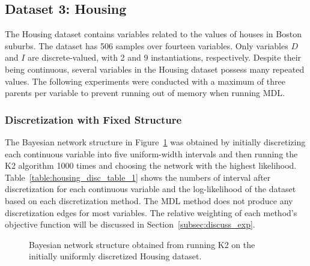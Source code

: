 \documentclass[twoside,11pt]{article}
\begin{document}
\subsection{Dataset 3: Housing}
\label{subsec:housing}

The Housing dataset contains variables related to the values of houses in Boston suburbs.
The dataset has \num{506} samples over fourteen variables.
Only variables $D$ and $I$ are discrete-valued, with \num{2} and \num{9} instantiations, respectively.
Despite their being continuous, several variables in the Housing dataset possess many repeated values.
The following experiments were conducted with a maximum of three parents per variable to prevent running out of memory when running MDL.

\subsubsection{Discretization with Fixed Structure}
\label{subsubsec:housing_exp1}

The Bayesian network structure in Figure~\ref{fig:housing_graph_1} was obtained by initially discretizing each continuous variable into five uniform-width intervals and then running the K2 algorithm \num{1000} times and choosing the network with the highest likelihood.
Table~\ref{table:housing_disc_table_1} shows the numbers of interval after discretization for each continuous variable and the log-likelihood of the dataset based on each discretization method.
The MDL method does not produce any discretization edges for most variables.
The relative weighting of each method's objective function will be discussed in Section~\ref{subsec:discuss_exp}.


\begin{figure}[ht]
  \centering
  \scalebox{0.8}{}
  \caption{Bayesian network structure obtained from running K2 on the initially uniformly discretized Housing dataset.}
  \label{fig:housing_graph_1}
\end{figure}
\end{document}
